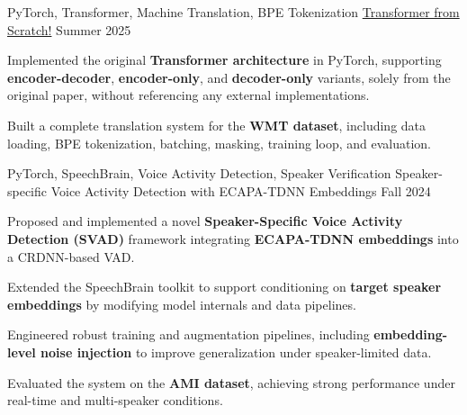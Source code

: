 

\begin{cventries}

\cventry
  {PyTorch, Transformer, Machine Translation, BPE Tokenization} %
  {\href{https://github.com/radinshayanfar/transformer}{Transformer from Scratch!}} %
  {} %
  {Summer 2025} %
  {
    \begin{cvitems}
      \item {Implemented the original \textbf{Transformer architecture} in PyTorch, supporting \textbf{encoder-decoder}, \textbf{encoder-only}, and \textbf{decoder-only} variants, solely from the original paper, without referencing any external implementations.}
      \item {Built a complete translation system for the \textbf{WMT dataset}, including data loading, BPE tokenization, batching, masking, training loop, and evaluation.}
    \end{cvitems}
  }

\cventry
    {PyTorch, SpeechBrain, Voice Activity Detection, Speaker Verification} %
    {Speaker-specific Voice Activity Detection with ECAPA-TDNN Embeddings} %
    {} %
    {Fall 2024} %
    {
      \begin{cvitems}
        \item {Proposed and implemented a novel \textbf{Speaker-Specific Voice Activity Detection (SVAD)} framework integrating \textbf{ECAPA-TDNN embeddings} into a CRDNN-based VAD.}
        \item {Extended the SpeechBrain toolkit to support conditioning on \textbf{target speaker embeddings} by modifying model internals and data pipelines.}
        \item {Engineered robust training and augmentation pipelines, including \textbf{embedding-level noise injection} to improve generalization under speaker-limited data.}
        \item {Evaluated the system on the \textbf{AMI dataset}, achieving strong performance under real-time and multi-speaker conditions.}
      \end{cvitems}
    }
    

\end{cventries}
